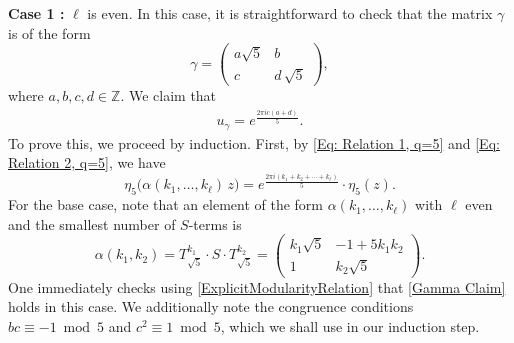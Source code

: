 \documentclass[11pt]{amsart}
\numberwithin{equation}{section}
\theoremstyle{remark}
\begin{document}
\noindent \textbf{Case 1 :} $\ell$ is even. In this case, it is straightforward to check that the matrix $\gamma$ is of the form
\[
\gamma = \begin{pmatrix} a\sqrt{5}&b\\
c  & d\,\sqrt{5}\end{pmatrix},
\]
where $a,b,c,d \in \mathbb{Z}$. We claim that 
\begin{align}\label{Gamma Claim}
u_{\gamma} = e^{\frac{2 \pi i c(a+d)}{5}}.
\end{align}
To prove this, we proceed by induction. First, by \eqref{Eq: Relation 1, q=5} and \eqref{Eq: Relation 2, q=5}, we have
\begin{equation} \label{ExplicitModularityRelation}
\eta_5\Big(\alpha(k_1,\ldots,k_\ell)\, z\big) = e^{{\frac{2\pi i(k_1+k_2+\cdots+k_\ell)}{5}} }\cdot \eta_5(z).
\end{equation}
For the base case, note that an element of the form $\alpha(k_1,\ldots,k_\ell)$ with $\ell$ even and the smallest  number of $S$-terms is $$\alpha(k_1,k_2) = T_{\sqrt{5}}^{k_1} \cdot S \cdot T_{\sqrt{5}}^{k_2} = \begin{pmatrix}k_1\sqrt{5}& -1+5k_1k_2\\
1& k_2  \sqrt{5} \end{pmatrix}.$$
One immediately checks using \eqref{ExplicitModularityRelation} that \eqref{Gamma Claim} holds in this case. We additionally note the congruence conditions $bc\equiv -1\bmod{5} $ and $c^2 \equiv 1 \bmod 5$, which we shall use in our induction step.
\end{document}
